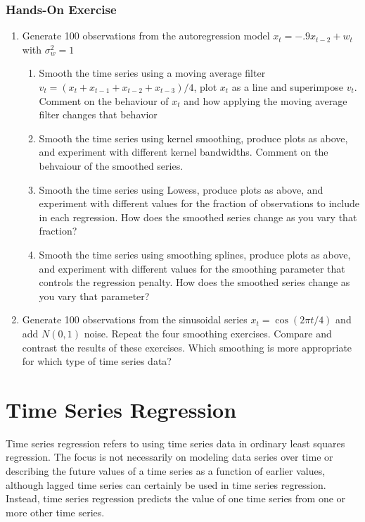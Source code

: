 \begin{tcolorbox}[colback=code]
\subsubsection*{Hands-On Exercise} 
\begin{enumerate}
\item Generate 100 observations from the autoregression model $x_t = -.9x_{t-2} + w_t$ with $\sigma^2_w = 1$
\begin{enumerate}
   \item Smooth the time series using a moving average filter $v_t = (x_t + x_{t-1} + x_{t-2} + x_{t-3})/4$, plot $x_t$ as a line and superimpose $v_t$. Comment on the behaviour of $x_t$ and how applying the moving average filter changes that behavior
   \item Smooth the time series using kernel smoothing, produce plots as above, and experiment with different kernel bandwidths. Comment on the behvaiour of the smoothed series.
   \item Smooth the time series using Lowess, produce plots as above, and experiment with different values for the fraction of observations to include in each regression. How does the smoothed series change as you vary that fraction?
   \item Smooth the time series using smoothing splines, produce plots as above, and experiment with different values for the smoothing parameter that controls the regression penalty. How does the smoothed series change as you vary that parameter?
\end{enumerate}

\item Generate 100 observations from the sinusoidal series $x_t = \cos(2 \pi t / 4)$ and add $N(0,1)$ noise. Repeat the four smoothing exercises. Compare and contrast the results of these exercises. Which smoothing is more appropriate for which type of time series data?
\end{enumerate}
\end{tcolorbox}

\section{Time Series Regression}

Time series regression refers to using time series data in ordinary least squares regression. The focus is not necessarily on modeling data series over time or describing the future values of a time series as a function of earlier values, although lagged time series can certainly be used in time series regression. Instead, time series regression predicts the value of one time series from one or more other time series. 

